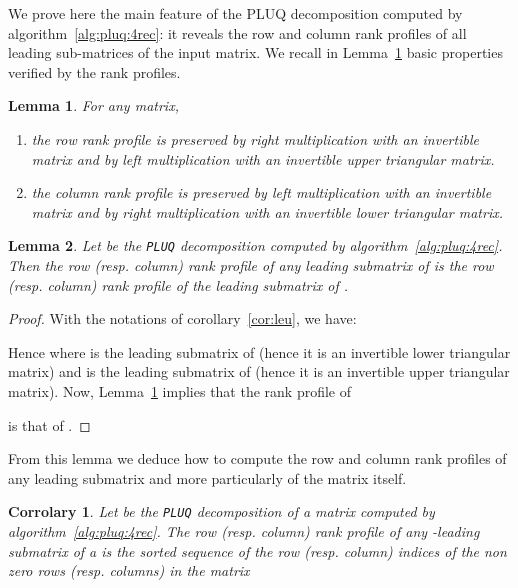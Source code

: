 \documentclass{article}
\newcommand{\strechparskip}[1]{}
\newcommand{\strechparsep}[1]{}
\newcommand{\customvspace}[1]{}
\newcommand{\pluq}{\texttt{PLUQ}\xspace}
\newtheorem{lemma}{Lemma}
\newtheorem{corrolary}{Corrolary}
\begin{document}
We prove here the main feature of the PLUQ decomposition computed by
algorithm~\ref{alg:pluq:4rec}: it reveals the row and column rank profiles of all leading
sub-matrices of the input matrix.
We recall in Lemma~\ref{lem:rankprofiletransf} basic properties verified by the
rank profiles.
\begin{lemma} For any matrix,
\label{lem:rankprofiletransf}
\begin{enumerate}\customvspace{-5pt}\strechparsep{-1pt}\strechparskip{0pt}
\item\label{point:rrp} the row rank profile is preserved by right multiplication
  with an invertible matrix and by left multiplication with an invertible upper
  triangular matrix.
\item\label{point:crp} the column rank profile is preserved by left multiplication with an
  invertible matrix and by right multiplication with an invertible lower
  triangular matrix.
\customvspace{-5pt}\end{enumerate}
\end{lemma}






\begin{lemma}
  Let  be the \pluq decomposition computed by algorithm~\ref{alg:pluq:4rec}.
  Then the row (resp. column) rank profile of any leading  submatrix of
   is the row (resp. column) rank profile of the leading  submatrix
  of .
\end{lemma}
\begin{proof}With the notations of corollary~\ref{cor:leu}, we have:
  
Hence 
where  is the  leading submatrix of 
(hence it is an invertible lower triangular matrix) and  is the
   leading submatrix of  (hence it is an invertible
  upper triangular matrix). 
Now, Lemma~\ref{lem:rankprofiletransf} implies  that the rank profile of 

is that of 
.
\end{proof}



From this lemma we deduce how to compute the row and column rank profiles of any
 leading submatrix and more particularly of the matrix  itself.

\begin{corrolary}
  Let  be the \pluq decomposition of a  matrix computed by  algorithm~\ref{alg:pluq:4rec}.
  The row (resp. column) rank profile of any -leading submatrix of a
    is the sorted sequence of the row
  (resp. column) indices of the non zero rows (resp. columns) in the matrix 

\end{corrolary}
\end{document}
